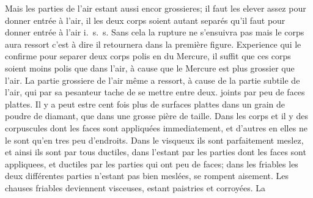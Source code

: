 \noindent%
Mais les parties de l'air estant aussi encor grossieres; il faut les elever assez pour donner entr\'{e}e \`{a} l'air, il
les deux corps
soient autant separ\'{e}s qu'il faut pour donner entr\'{e}e \`{a} l'air i.~s.~s.
Sans cela la rupture ne s'ensuivra pas mais le corps aura ressort\protect{} c'est \`{a} dire il retournera dans la premi\`{e}re figure.%
%
\newline%
Experience\protect{}%
qui le confirme pour separer deux corps polis en du Mercure,\protect{}
il suffit que ces corps soient moins polis que dans l'air, \`{a} cause que le Mercure\protect{}
est plus grossier que l'air. La partie grossiere de l'air même a ressort\protect{}, \`{a} cause de la partie subtile de l'air, qui par sa pesanteur\protect{} tache de se mettre entre deux.%
%
\pend%
\pstart%
%
%
joints par peu de faces plattes.
Il y a peut estre cent fois plus de surfaces plattes dans un grain de poudre\protect{} de diamant, que dans une grosse pi\`{e}re de taille.%
\pend%
\count{}
\count{}
\pstart%
Dans les corps  et  il y
des corpuscules\protect{}
dont les faces sont appliqu\'{e}es immediatement, et d'autres en elles ne le sont qu'en tres peu d'endroits. Dans le visqueux ils sont parfaitement meslez, et ainsi ils sont par tous ductiles, dans l'estant  par les parties dont les faces sont appliquees, et ductiles par les parties qui ont peu de faces; dans les friables les deux diff\'{e}rentes parties n'estant pas bien mesl\'{e}es, se rompent aisement. Les chauses friables deviennent visceuses, estant paistries et corroy\'{e}es.%
%
\pend%
\pstart%
La%
